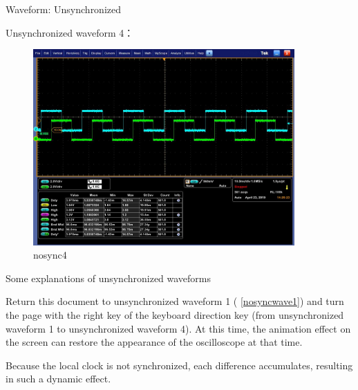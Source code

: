 \begin{frame}[fragile]{Waveform: Unsynchronized}

Unsynchronized waveform 4：

  \begin{figure}[htbp]
  \begin{center}
  \includegraphics[width=10cm]{img/nosync4}
  \caption{nosync4}
  \label{report}
  \end{center}
  \vspace{-0.5em}
  \end{figure}


\end{frame}


\begin{frame}[fragile]{Some explanations of unsynchronized waveforms}


Return this document to unsynchronized waveform 1 ( \ref {nosyncwave1}) and turn the page with the right key of the keyboard direction key (from unsynchronized waveform 1 to unsynchronized waveform 4). At this time, the animation effect on the screen can restore the appearance of the oscilloscope at that time.

Because the local clock is not synchronized, each difference accumulates, resulting in such a dynamic effect.


\end{frame}



